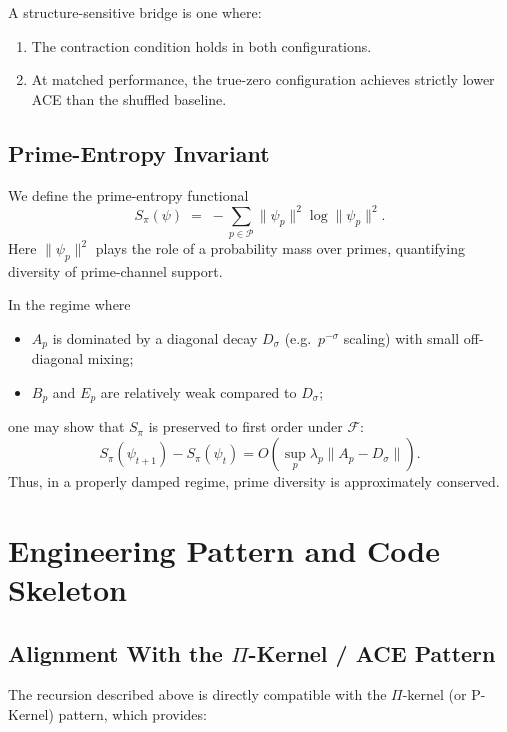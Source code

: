 \documentclass[11pt]{article}
\begin{document}
A structure-sensitive bridge is one where:
\begin{enumerate}[label=(\roman*),leftmargin=1.5em]
  \item The contraction condition holds in both configurations.
  \item At matched performance, the true-zero configuration achieves strictly lower ACE than the shuffled baseline.
\end{enumerate}

\subsection{Prime-Entropy Invariant}

We define the prime-entropy functional
\begin{equation}
  S_\pi(\psi) \;=\; - \sum_{p \in \mathcal{P}} \|\psi_p\|^2 \log \|\psi_p\|^2.
\end{equation}
Here $\|\psi_p\|^2$ plays the role of a probability mass over primes, quantifying diversity of prime-channel support.

In the regime where
\begin{itemize}[leftmargin=1.5em]
  \item $A_p$ is dominated by a diagonal decay $D_\sigma$ (e.g.\ $p^{-\sigma}$ scaling) with small off-diagonal mixing;
  \item $B_p$ and $E_p$ are relatively weak compared to $D_\sigma$;
\end{itemize}
one may show that $S_\pi$ is preserved to first order under $\mathcal{F}$:
\begin{equation}
  S_\pi(\psi_{t+1}) - S_\pi(\psi_t) = O\left( \sup_p \lambda_p \| A_p - D_\sigma \| \right).
\end{equation}
Thus, in a properly damped regime, prime diversity is approximately conserved.

\section{Engineering Pattern and Code Skeleton}

\subsection{Alignment With the $\Pi$-Kernel / ACE Pattern}

The recursion described above is directly compatible with the $\Pi$-kernel (or P-Kernel) pattern, which provides:
\end{document}
